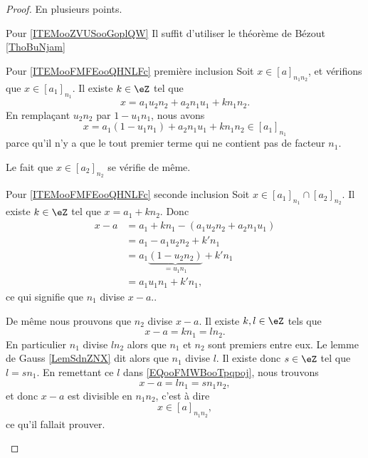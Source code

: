 \begin{proof}
	En plusieurs points.
	\begin{subproof}
		\item[Pour \ref{ITEMooZVUSooGoplQW}]
		Il suffit d'utiliser le théorème de Bézout \ref{ThoBuNjam}
		\item[Pour \ref{ITEMooFMFEooQHNLFc} première inclusion]
		Soit \( x\in[a]_{n_1n_2}\), et vérifions que \( x\in[a_1]_{n_1}\). Il existe \( k\in \eZ\) tel que
		\begin{equation}
			x=a_1u_2n_2+a_2n_1u_1+kn_1n_2.
		\end{equation}
		En remplaçant \( u_2n_2\) par \( 1-u_1n_1\), nous avons
		\begin{equation}
			x=a_1(1-u_1n_1)+a_2n_1u_1+kn_1n_2\in [a_1]_{n_1}
		\end{equation}
		parce qu'il n'y a que le tout premier terme qui ne contient pas de facteur \( n_1\).

		Le fait que \( x\in[a_2]_{n_2}\) se vérifie de même.

		\item[Pour \ref{ITEMooFMFEooQHNLFc} seconde inclusion]
		Soit \( x\in [a_1]_{n_1}\cap [a_2]_{n_2}\). Il existe \( k\in \eZ\) tel que \( x=a_1+kn_2\). Donc
		\begin{subequations}
			\begin{align}
				x-a & =a_1+kn_1-(a_1u_2n_2+a_2n_1u_1)             \\
				    & =a_1-a_1u_2n_2+k'n_1                        \\
				    & =a_1\underbrace{(1-u_2n_2)}_{=u_1n_1}+k'n_1 \\
				    & =a_1u_1n_1+k'n_1,
			\end{align}
		\end{subequations}
		ce qui signifie que \( n_1\) divise \( x-a.\).

		De même nous prouvons que \( n_2\) divise \( x-a\). Il existe \( k,l\in \eZ\) tels que
		\begin{equation}        \label{EQooFMWBooTpqpoj}
			x-a=kn_1=ln_2.
		\end{equation}
		En particulier \( n_1\) divise \( ln_2\) alors que \( n_1\) et \( n_2\) sont premiers entre eux. Le lemme de Gauss \ref{LemSdnZNX} dit alors que \( n_1\) divise \( l\). Il existe donc \( s\in \eZ\) tel que \( l=sn_1\). En remettant ce \( l\) dans \eqref{EQooFMWBooTpqpoj}, nous trouvons
		\begin{equation}
			x-a=ln_1=sn_1n_2,
		\end{equation}
		et donc \( x-a\) est divisible en \( n_1n_2\), c'est à dire
		\begin{equation}
			x\in [a]_{n_1n_2},
		\end{equation}
		ce qu'il fallait prouver.
	\end{subproof}
\end{proof}

